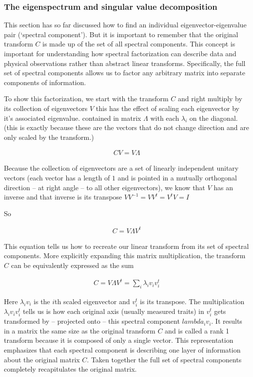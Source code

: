 \documentclass[
  letterpaper,
  DIV=11,
  numbers=noendperiod]{scrartcl}
\begin{document}
\hypertarget{the-eigenspectrum-and-singular-value-decomposition}{%
\subsubsection{The eigenspectrum and singular value
decomposition}\label{the-eigenspectrum-and-singular-value-decomposition}}

This section has so far discussed how to find an individual
eigenvector-eigenvalue pair (`spectral component'). But it is important
to remember that the original transform \(C\) is made up of the set of
all spectral components. This concept is important for understanding how
spectral factorization can describe data and physical observations
rather than abstract linear transforms. Specifically, the full set of
spectral components allows us to factor any arbitrary matrix into
separate components of information.

To show this factorization, we start with the transform \(C\) and right
multiply by its collection of eigenvectors \(V\) this has the effect of
scaling each eigenvector by it's associated eigenvalue. contained in
matrix \(\Lambda\) with each \(\lambda_i\) on the diagonal. (this is
exactly because these are the vectors that do not change direction and
are only scaled by the transform.)

\begin{align*}
CV = V\Lambda
\end{align*}

Because the collection of eigenvectors are a set of linearly independent
unitary vectors (each vector has a length of \(1\) and is pointed in a
mutually orthogonal direction -- at right angle -- to all other
eigenvectors), we know that \(V\) has an inverse and that inverse is its
transpose \(VV^{-1} = VV^{t} = V^{t}V = I\)

So

\begin{align*}
C = V\Lambda V^t
\end{align*}

This equation tells us how to recreate our linear transform from its set
of spectral components. More explicitly expanding this matrix
multiplication, the transform \(C\) can be equivalently expressed as the
sum

\begin{align*}
C = V\Lambda V^t = \sum_i \lambda_i v_i v_i^t
\end{align*}

Here \(\lambda_i v_i\) is the \(i\)th scaled eigenvector and \(v_i^t\)
is its transpose. The multiplication \(\lambda_i v_i v_i^t\) tells us is
how each original axis (usually measured traits) in \(v_i^t\) gets
transformed by -- projected onto -- this spectral component
\(lambda_i v_i\). It results in a matrix the same size as the original
transform \(C\) and is called a rank 1 transform because it is composed
of only a single vector. This representation emphasizes that each
spectral component is describing one layer of information about the
original matrix \(C\). Taken together the full set of spectral
components completely recapitulates the original matrix.
\end{document}
